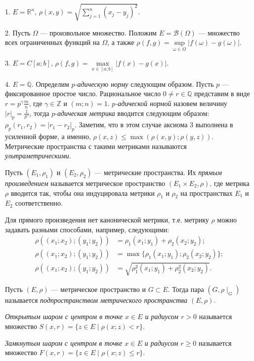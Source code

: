 \documentclass[10pt,titlepage, a4paper]{article}
\begin{document}
\prim

1. $E=\mathbb{R}^n$,
$\rho(x,y)=\sqrt{\sum\limits_{j=1}^n(x_j-y_j)^2}$.

2. Пусть $\Omega$ --- произвольное множество. Положим
$E=\mathcal{B}(\Omega)$ --- множество всех ограниченных функций на
$\Omega$, а также
$\rho(f,g)=\sup\limits_{\omega\in\Omega}|f(\omega)-g(\omega)|$.

3. $E=C[a;b]$, $\rho(f,g)=\max\limits_{x\in[a;b]}|f(x)-g(x)|$.

4. $E=\mathbb{Q}$. Определим \emph{$p$-адическую норму} следующим
образом. Пусть $p$ --- фиксированное простое число. Рациональное
число $0\neq r\in\mathbb{Q}$ представим в виде $r=p^\gamma\frac m
n$, где $\gamma\in\mathbb{Z}$ и $(m;n)=1$. \emph{$p$-адической
нормой} назовем величину $|r|_p=\frac{1}{p^\gamma}$, тогда
$p$-\emph{адическая метрика} вводится следующим образом:
$\rho_p(r_1,r_2)=|r_1-r_2|_p$. Заметим, что в этом случае аксиома 3
выполнена в усиленной форме, а именно,
$\rho(x,z)\leqslant\max(\rho(x,y);\rho(y,z))$. Метрические
пространства с такими метриками называются
\emph{ультраметрическими}.

\begin{defen}
Пусть $(E_1,\rho_1)$ и $(E_2,\rho_2)$ --- метрические пространства.
Их \emph{прямым произведением} называется метрическое пространство
$(E_1\times E_2,\rho)$, где метрика $\rho$ вводится так, чтобы она
индуцировала метрики $\rho_1$ и $\rho_2$ на пространствах $E_1$ и
$E_2$ соответственно.
\end{defen}

\begin{zam}
Для прямого произведения нет канонической метрики, т.е. метрику
$\rho$ можно задавать разными способами, например, следующими:
\begin{align*}
\rho((x_1;x_2);(y_1;y_2))&=\rho_1(x_1;y_1)+\rho_2(x_2;y_2);\\
\rho((x_1;x_2);(y_1;y_2))&=\max\{\rho_1(x_1;y_1);\rho_2(x_2;y_2)\};\\
\rho((x_1;x_2);(y_1;y_2))&=\sqrt{\rho_1^2(x_1;y_1)+\rho_2^2(x_2;y_2)}.
\end{align*}
\end{zam}

\begin{defen}
Пусть $(E,\rho)$ --- метрическое пространство и $G\subset E$. Тогда
пара $(G,\rho\mid_G)$ называется \emph{подпространством метрического
пространства $(E,\rho)$}.
\end{defen}

\begin{defen}
\emph{Открытым шаром с центром в точке $x\in E$ и радиусом $r>0$}
называется множество $S(x,r)=\{z\in E\mid\rho(x;z)<r\}$.

\emph{Замкнутым шаром с центром в точке $x\in E$ и радиусом
$r\geqslant0$} называется множество $F(x,r)=\{z\in
E\mid\rho(x;z)\leqslant r\}$.
\end{defen}
\end{document}

